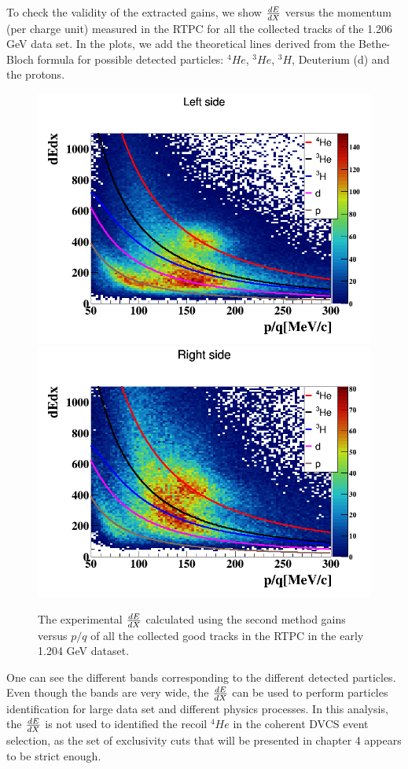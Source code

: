 To check the validity of the extracted gains, we show $\small{\frac{dE}{dX}}$ 
versus the momentum (per charge unit) measured in the RTPC for all the 
collected tracks of the 1.206 GeV data set. In the plots, we add the 
theoretical lines derived from the Bethe-Bloch formula for possible detected 
particles: $^4He$, $^3He$, $^3H$, Deuterium (d) and the protons.
\begin{figure}[tbp]
\includegraphics[scale=0.35]{fig_rtpc/updates/dedx_p_l.png}
\includegraphics[scale=0.35]{fig_rtpc/updates/dedx_p_r.png}
\caption{The experimental $\small{\frac{dE}{dX}}$ calculated using the second method gains versus $p/q$ of all the collected good tracks in the RTPC in the early 1.204 GeV dataset.}
\label{fig:dedx_all}
\end{figure}
One can see the different bands corresponding to the different detected particles.  
Even though the bands are very wide, the $\small{\frac{dE}{dX}}$ can be used to 
perform particles identification for large data set and different physics 
processes. In this analysis, the $\small{\frac{dE}{dX}}$ is not used to 
identified the recoil $^{4}He$ in the coherent DVCS event selection, as the 
 set of exclusivity cuts that will be 
presented in chapter 4 appears to be strict enough.


